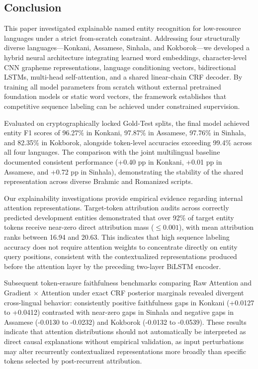 \documentclass[pdflatex,sn-mathphys-num]{sn-jnl}
\begin{document}
\subsection{Conclusion}\label{subsec:conclusion}

This paper investigated explainable named entity recognition for low-resource languages under a strict from-scratch constraint. Addressing four structurally diverse languages---Konkani, Assamese, Sinhala, and Kokborok---we developed a hybrid neural architecture integrating learned word embeddings, character-level CNN grapheme representations, language conditioning vectors, bidirectional LSTMs, multi-head self-attention, and a shared linear-chain CRF decoder. By training all model parameters from scratch without external pretrained foundation models or static word vectors, the framework establishes that competitive sequence labeling can be achieved under constrained supervision.

Evaluated on cryptographically locked Gold-Test splits, the final model achieved entity F1 scores of 96.27\% in Konkani, 97.87\% in Assamese, 97.76\% in Sinhala, and 82.35\% in Kokborok, alongside token-level accuracies exceeding 99.4\% across all four languages. The comparison with the joint multilingual baseline documented consistent performance (+0.40 pp in Konkani, +0.01 pp in Assamese, and +0.72 pp in Sinhala), demonstrating the stability of the shared representation across diverse Brahmic and Romanized scripts.

Our explainability investigations provide empirical evidence regarding internal attention representations. Target-token attribution audits across correctly predicted development entities demonstrated that over 92\% of target entity tokens receive near-zero direct attribution mass ($\le 0.001$), with mean attribution ranks between 16.94 and 20.63. This indicates that high sequence labeling accuracy does not require attention weights to concentrate directly on entity query positions, consistent with the contextualized representations produced before the attention layer by the preceding two-layer BiLSTM encoder.

Subsequent token-erasure faithfulness benchmarks comparing Raw Attention and Gradient $\times$ Attention under exact CRF posterior marginals revealed divergent cross-lingual behavior: consistently positive faithfulness gaps in Konkani (+0.0127 to +0.0412) contrasted with near-zero gaps in Sinhala and negative gaps in Assamese (-0.0130 to -0.0232) and Kokborok (-0.0132 to -0.0539). These results indicate that attention distributions should not automatically be interpreted as direct causal explanations without empirical validation, as input perturbations may alter recurrently contextualized representations more broadly than specific tokens selected by post-recurrent attribution.
\end{document}
